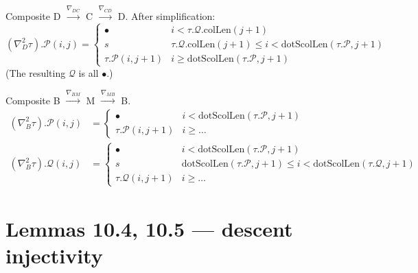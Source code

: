 \begin{definition}
  \label{def:doubleDescent_D}
  \leanok
  Composite D $\xrightarrow{\nabla_{DC}}$ C $\xrightarrow{\nabla_{CD}}$ D.
  After simplification:
  \[
    (\nabla^2_D \tau).\mathcal{P}(i, j) = \begin{cases}
      \bullet & i < \tau.\mathcal{Q}.\mathrm{colLen}(j + 1) \\
      s & \tau.\mathcal{Q}.\mathrm{colLen}(j + 1) \leq i < \mathrm{dotScolLen}(\tau.\mathcal{P}, j + 1) \\
      \tau.\mathcal{P}(i, j + 1) & i \geq \mathrm{dotScolLen}(\tau.\mathcal{P}, j + 1)
    \end{cases}
  \]
  (The resulting $\mathcal{Q}$ is all $\bullet$.)
\end{definition}

\begin{definition}
  \label{def:doubleDescent_B}
  \leanok
  Composite B $\xrightarrow{\nabla_{BM}}$ M $\xrightarrow{\nabla_{MB}}$ B.
  \begin{align*}
    (\nabla^2_B \tau).\mathcal{P}(i, j) &= \begin{cases} \bullet & i < \mathrm{dotScolLen}(\tau.\mathcal{P}, j + 1) \\ \tau.\mathcal{P}(i, j + 1) & i \geq \ldots \end{cases} \\
    (\nabla^2_B \tau).\mathcal{Q}(i, j) &= \begin{cases} \bullet & i < \mathrm{dotScolLen}(\tau.\mathcal{P}, j + 1) \\ s & \mathrm{dotScolLen}(\tau.\mathcal{P}, j + 1) \leq i < \mathrm{dotScolLen}(\tau.\mathcal{Q}, j + 1) \\ \tau.\mathcal{Q}(i, j + 1) & i \geq \ldots \end{cases}
  \end{align*}
\end{definition}

\section{Lemmas 10.4, 10.5 — descent injectivity}

